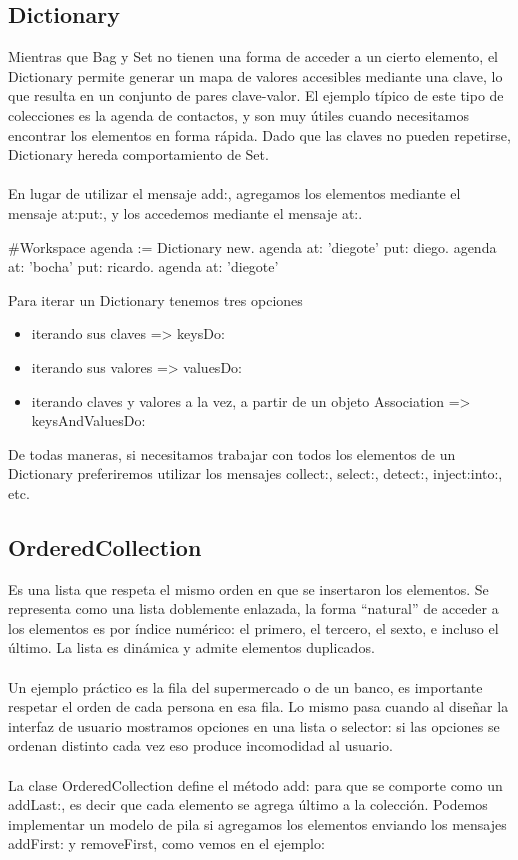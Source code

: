 \documentclass[a4paper,12pt]{book}
\begin{document}
\subsection{Dictionary}

Mientras que Bag y Set no tienen una forma de acceder a un cierto elemento, el Dictionary permite generar un
mapa de valores accesibles mediante una clave, lo que resulta en un conjunto de pares clave-valor. El ejemplo
típico de este tipo de colecciones es la agenda de contactos, y son muy útiles cuando necesitamos
encontrar los elementos en forma rápida. Dado que las claves no pueden repetirse, Dictionary hereda
comportamiento de Set. 
\\
\\
En lugar de utilizar el mensaje add:, agregamos los elementos mediante el mensaje at:put:, y los accedemos
mediante el mensaje at:.

\begin{code}
#Workspace
agenda := Dictionary new.
agenda at: 'diegote' put: diego.
agenda at: 'bocha' put: ricardo.
agenda at: 'diegote'
\end{code}

Para iterar un Dictionary tenemos tres opciones

\begin{itemize}
 \item iterando sus claves => keysDo:
 \item iterando sus valores => valuesDo:
 \item iterando claves y valores a la vez, a partir de un objeto Association => 
 keysAndValuesDo:
\end{itemize}

De todas maneras, si necesitamos trabajar con todos los elementos de un Dictionary preferiremos utilizar
los mensajes collect:, select:, detect:, inject:into:, etc.

\subsection{OrderedCollection}

Es una lista que respeta el mismo orden en que se insertaron los elementos. Se representa como una lista
doblemente enlazada, la forma ``natural'' de acceder a los elementos es por índice numérico: el primero, 
el tercero, el sexto, e incluso el último. La lista es dinámica y admite elementos duplicados. 
\\
\\
Un ejemplo práctico es la fila del supermercado o de un banco, es importante respetar el orden de cada
persona en esa fila. Lo mismo pasa cuando al diseñar la interfaz de usuario mostramos opciones en una
lista o selector: si las opciones se ordenan distinto cada vez eso produce incomodidad al usuario.
\\
\\
La clase OrderedCollection define el método add: para que se comporte como un addLast:, es decir que cada
elemento se agrega último a la colección. Podemos implementar un modelo de pila si agregamos los elementos
enviando los mensajes addFirst: y removeFirst, como vemos en el ejemplo:
\end{document}

